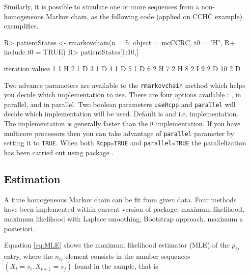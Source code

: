 \documentclass[
  nojss]{jss}
\begin{document}
Similarly, it is possible to simulate one or more sequences from a non-homogeneous Markov chain,
as the following code (applied on CCHC example) exemplifies.

\begin{CodeChunk}

\begin{CodeInput}
R> patientStates <- rmarkovchain(n = 5, object = mcCCRC, t0 = "H", 
R+                               include.t0 = TRUE)
R> patientStates[1:10,]
\end{CodeInput}

\begin{CodeOutput}
   iteration values
1          1      H
2          1      D
3          1      D
4          1      D
5          1      D
6          2      H
7          2      H
8          2      I
9          2      D
10         2      D
\end{CodeOutput}
\end{CodeChunk}

Two advance parameters are available to the \texttt{rmarkovchain} method which helps you decide which implementation to use. There are four options available : ,  in parallel,  and  in parallel. Two boolean parameters \texttt{useRcpp} and \texttt{parallel} will decide which implementation will be used. Default is  and  i.e.  implementation. The  implementation is generally faster than the \texttt{R} implementation. If you have multicore processors then you can take advantage of \texttt{parallel} parameter by setting it to \texttt{TRUE}. When both \texttt{Rcpp=TRUE} and \texttt{parallel=TRUE} the parallelization has been carried out using  package \citep{pkg:RcppParallel}.

\hypertarget{estimation}{%
\subsection{Estimation}\label{estimation}}

A time homogeneous Markov chain can be fit from given data. Four methods have been implemented within current version of  package: maximum likelihood, maximum likelihood with Laplace smoothing, Bootstrap approach, maximum a posteriori.

Equation \ref{eq:MLE} shows the maximum likelihood estimator (MLE) of the \(p_{ij}\) entry, where the \(n_{ij}\) element consists in the number sequences \(\left( X_{t}=s_{i}, X_{t+1}=s_{j}\right)\) found in the sample, that is
\end{document}
